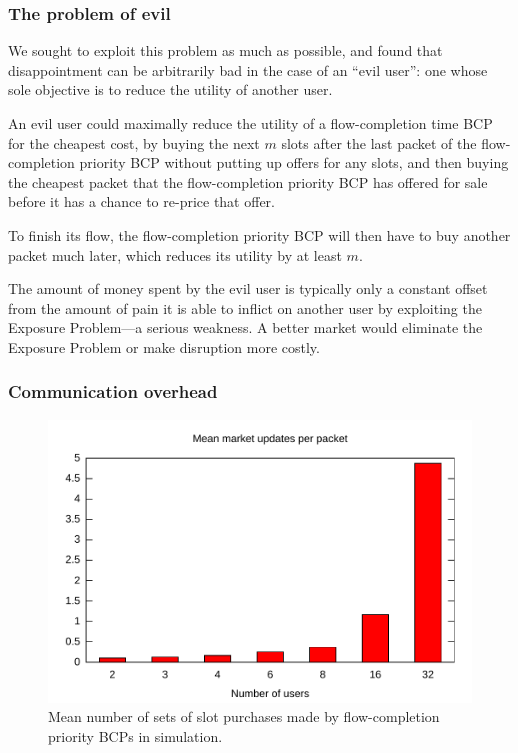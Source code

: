 \subsubsection{The problem of evil}
\label{ss:evil}
We sought to exploit this problem as much as possible, and found that
disappointment can be arbitrarily bad in the case of an ``evil user'':
one whose sole objective is to reduce the utility of another
user.

An evil user could maximally reduce the utility of a flow-completion
time BCP for the cheapest cost, by buying the next $m$ slots after the
last packet of the flow-completion priority BCP without putting up
offers for any slots, and then buying the cheapest packet that the
flow-completion priority BCP has offered for sale before it has a
chance to re-price that offer.

To finish its flow, the flow-completion priority BCP
will then have to buy another packet much later, which reduces its
utility by at least $m$.

The amount of money spent by the evil user is typically only a
constant offset from the amount of pain it is able to inflict on
another user by exploiting the Exposure Problem---a serious
weakness. A better market would eliminate the Exposure Problem or make
disruption more costly.

\subsubsection{Communication overhead}

\begin{figure}
\includegraphics[width=\columnwidth]{plots/num_market_updates.pdf}
\caption{Mean number of sets of slot purchases made by flow-completion
priority BCPs in simulation.}
\label{f:num_market_updates}
\end{figure}

